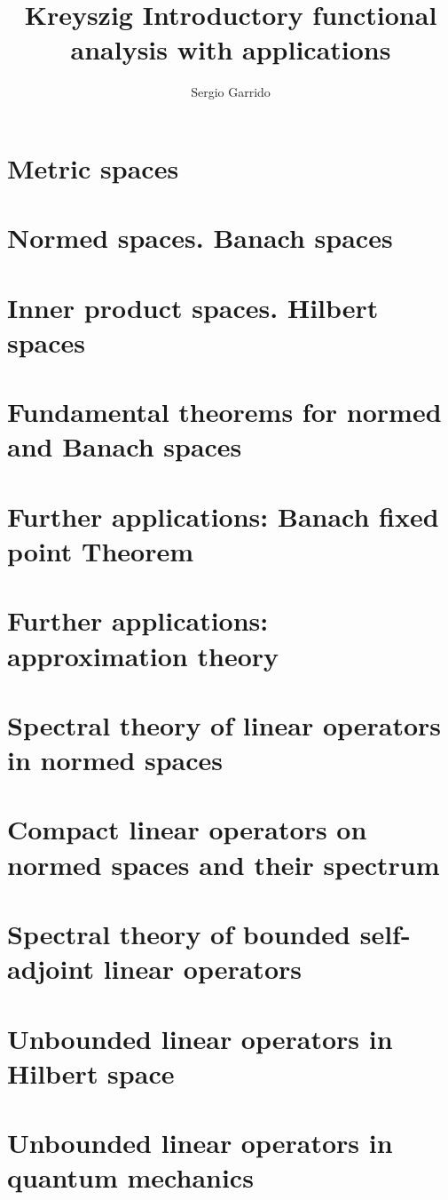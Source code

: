 \documentclass{bookSolutions}
\title{Kreyszig  Introductory functional analysis with applications}
\author{Sergio Garrido}
\begin{document}
\maketitle

\tableofcontents

\section{Metric spaces}







\section{Normed spaces. Banach spaces}











\section{Inner product spaces. Hilbert spaces}


\section{Fundamental theorems for normed and Banach spaces}


\section{Further applications: Banach fixed point Theorem}


\section{Further applications: approximation theory}


\section{Spectral theory of linear operators in normed spaces}


\section{Compact linear operators on normed spaces and their spectrum}


\section{Spectral theory of bounded self-adjoint linear operators}


\section{Unbounded linear operators in Hilbert space}


\section{Unbounded linear operators in quantum mechanics}

\end{document}
